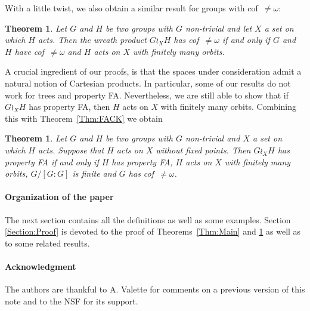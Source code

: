 \documentclass[a4paper]{article}
\newtheorem{thm}[lem]{Theorem}
\theoremstyle{definition}
\begin{document}
%
%
With a little twist, we also obtain a similar result for groups with cof~$\neq\omega$:
\begin{thm}\label{Thm:UncCoun}
Let $G$ and $H$ be two groups with $G$ non-trivial and let $X$ a set on which $H$ acts. Then the wreath product $G \wr_X H$ has cof~$\neq\omega$ if and only if $G$ and $H$ have cof~$\neq\omega$ and $H$ acts on $X$ with finitely many orbits.
\end{thm}
%
%
A crucial ingredient of our proofs, is that the spaces under consideration admit a natural notion of Cartesian products.
In particular, some of our results do not work for trees and property FA.
Nevertheless, we are still able to show that if $G\wr_XH$ has property FA, then $H$ acts on $X$ with finitely many orbits. Combining this with Theorem~\ref{Thm:FACK} we obtain
\begin{thm}\label{Thm:FAFiniteOrbits}
Let $G$ and $H$ be two groups with $G$ non-trivial and $X$ a set on which $H$ acts. Suppose that $H$ acts on $X$ without fixed points.
Then $G\wr_XH$ has property FA if and only if $H$ has property FA, $H$ acts on $X$ with finitely many orbits, $G/[G:G]$ is finite and $G$ has cof~$\neq\omega$.
\end{thm}
%
%
%
%
\paragraph{Organization of the paper}
The next section contains all the definitions as well as some examples. Section \ref{Section:Proof} is devoted to the proof of Theorems~\ref{Thm:Main} and \ref{Thm:UncCoun} as well as to some related results.
%
%
%
\paragraph{Acknowledgment}
The authors are thankful to A. Valette for comments on a previous version of this note and to the NSF for its support.
%
%
%
\end{document}
